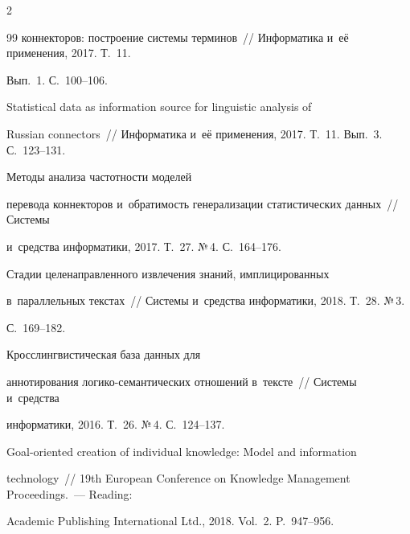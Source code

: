 \begin{multicols}{2}
{{\begin{thebibliography}{99}
коннекторов: построение сис\-те\-мы терминов~// Информатика и~её применения, 2017. Т.~11. 


Вып.~1. С.~100--106.




 Statistical data as information source for linguistic analysis of 


Russian connectors~// Информатика и~её применения, 2017. Т.~11. Вып.~3. С.~123--131.




 Методы анализа частотности моделей 


перевода коннекторов и~обратимость генерализации статистических данных~// Системы 


и~средства информатики, 2017. Т.~27. №\,4. С.~164--176.




 Стадии целенаправленного извлечения знаний, имплицированных 


в~параллельных текстах~// Системы и~средства информатики, 2018. Т.~28. №\,3.  


С.~169--182.




 Кросс\-лингвистическая база данных для 


аннотирования ло\-ги\-ко-се\-ман\-ти\-че\-ских отношений в~тексте~// Системы и~средства 


информатики, 2016. Т.~26. №\,4. С.~124--137.




 Goal-oriented creation of individual knowledge: Model and information 


technology~// 19th European Conference on Knowledge Management Proceedings.~--- Reading: 


Academic Publishing International Ltd., 2018. Vol.~2. P.~947--956.


 \end{thebibliography}





 }


 }





\end{multicols}





